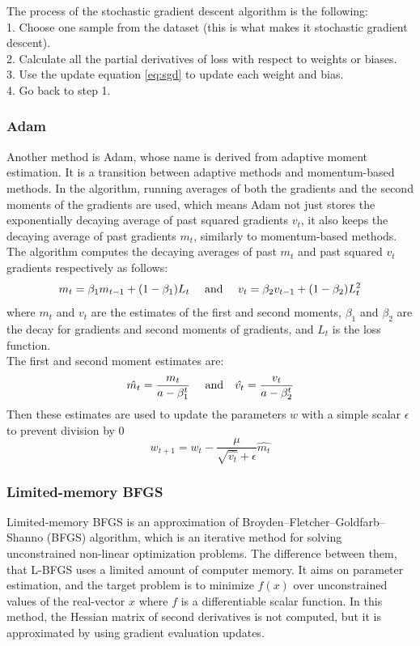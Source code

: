 \noindent The process of the stochastic gradient descent algorithm is the following:\\
1. Choose one sample from the dataset (this is what makes it stochastic gradient descent).\\
2. Calculate all the partial derivatives of loss with respect to weights or biases. \\
3. Use the update equation \eqref{eq:sgd} to update each weight and bias.\\
4. Go back to step 1.


\subsubsection{Adam}

Another method is Adam, whose name is derived from adaptive moment estimation. It is a transition between adaptive methods and momentum-based methods. In the algorithm, running averages of both the gradients and the second moments of the gradients are used, which means Adam not just stores the exponentially decaying average of past squared gradients $v_t$, it also keeps the decaying average of past gradients $m_t$, similarly to momentum-based methods. The algorithm computes the decaying averages of past $m_t$ and past squared $v_t$ gradients respectively as follows:
$$ m_t = \beta_1 m_{t-1} + (1-\beta_1)L_t ~~~~\hbox{and}~~~\ v_t = \beta_2 v_{t-1} + (1-\beta_2)L^2_t $$
where $m_t$ and $v_t$ are the estimates of the first and second moments, $\beta_1$ and $\beta_2$ are the decay for gradients and second moments of gradients, and $L_t$ is the loss function.\\
The first and second moment estimates are:
$$ \hat{m_t} = \frac{m_t}{a-\beta^t_1} ~~~~\hbox{and}~~~ \hat{v_t} = \frac{v_t}{a-\beta^t_2} $$
Then these estimates are used to update the parameters $w$ with a simple scalar $\epsilon$ to prevent division by 0
$$ w_{t+1} = w_t - \frac{\mu}{\sqrt{\hat{v_t}}+\epsilon}\hat{m_t} $$


\subsubsection{Limited-memory BFGS}

Limited-memory BFGS is an approximation of Broyden–Fletcher–Goldfarb–Shanno (BFGS) algorithm, which is an iterative method for solving unconstrained non-linear optimization problems. The difference between them, that L-BFGS uses a limited amount of computer memory. It aims on parameter estimation, and the target problem is to minimize $f(x)$ over unconstrained values of the real-vector $x$ where $f$ is a differentiable scalar function. In this method, the Hessian matrix of second derivatives is not computed, but it is approximated by using gradient evaluation updates. \medskip

